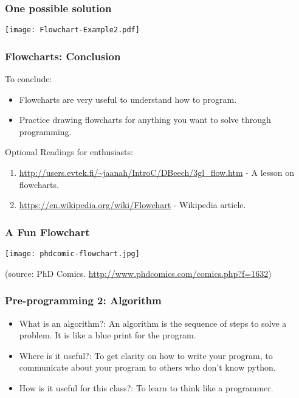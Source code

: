 \documentclass{beamer}
\begin{document}
\begin{frame}
\frametitle{One possible solution}
\texttt{[image: Flowchart-Example2.pdf]}
\end{frame}

\begin{frame}
\frametitle{Flowcharts: Conclusion}
To conclude:
\begin{itemize}
\item Flowcharts are very useful to understand how to program.
\item Practice drawing flowcharts for anything you want to solve through programming.
\end{itemize}
\medskip Optional Readings for enthusiasts:
\begin{enumerate}
\item \url{http://users.evtek.fi/~jaanah/IntroC/DBeech/3gl_flow.htm} - A lesson on flowcharts.
\item \url{https://en.wikipedia.org/wiki/Flowchart} - Wikipedia article.
\end{enumerate}
\end{frame}

\begin{frame}
\frametitle{A Fun Flowchart}
\texttt{[image: phdcomic-flowchart.jpg]}

\medskip (source: PhD Comics. \url{http://www.phdcomics.com/comics.php?f=1632})
\end{frame}

\begin{frame}%
\frametitle{Pre-programming 2: Algorithm}
\begin{itemize}
\item What is an algorithm?: An algorithm is the sequence of steps to solve a problem. It is like a blue print for the program.
\item Where is it useful?: To get clarity on how to write your program, to communicate about your program to others who don't know python.
\item How is it useful for this class?: To learn to think like a programmer.
\end{itemize}
\end{frame}
\end{document}
